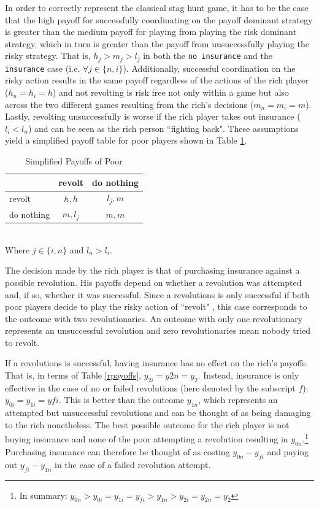 \documentclass[12pt]{article}
\begin{document}
	In order to correctly represent the classical stag hunt game, it has to be 
	the case that the high payoff for successfully coordinating on the payoff 
	dominant strategy is greater than the medium payoff for playing from 
	playing the risk dominant strategy, which in turn is greater than the 
	payoff from unsuccessfully playing the risky strategy. That is, $h_j > m_j 
	> l_j$ in both the \texttt{no insurance} and the \texttt{insurance} case 
	(i.e. $\forall j\in\{n, i\}$). Additionally, successful coordination on the 
	risky action results in the same payoff regardless of the actions of the 
	rich player ($h_n=h_i=h$) and not revolting is risk free not only within a 
	game but also across the two different games resulting from the rich's 
	decisions ($m_n=m_i=m$). Lastly, revolting unsuccessfully is worse if the 
	rich player takes out insurance ($l_i<l_n$) and can be seen as the rich 
	person ``fighting back". These assumptions yield a simplified payoff table 
	for poor players shown in Table \ref{spayoff}.
	
	\begin{table}[!htbp]
		\caption{Simplified Payoffs of Poor}
		\label{spayoff}
		\centering
		\begin{tabular}{|l|c|c|}
			\hline
			& revolt & do nothing\\
			\hline
			revolt & $h, h$ & $l_j, m$\\
			\hline
			do nothing & $m, l_j$ & $m, m$\\
			\hline
		\end{tabular}\\
		\footnotesize Where $j\in\{i, n\}$ and $l_n>l_i$.
	\end{table}
	
	The decision made by the rich player is that of purchasing insurance 
	against a possible revolution. His payoffs depend on whether a revolution 
	was attempted and, if so, whether it was successful. Since a revolutions is 
	only successful if both poor players decide to play the risky action of 
	``revolt" , this case corresponds to the outcome with two revolutionaries. 
	An outcome with only one revolutionary represents an unsuccessful 
	revolution and zero revolutionaries mean nobody tried to revolt.
	
	If a revolutions is successful, having insurance has no effect on the 
	rich's payoffs. That is, in terms of Table \ref{rpayoffs}, 
	$y_{2i}=y{2n}=y_2$. Instead, insurance is only effective in the case of no 
	or failed revolutions (here denoted by the subscript $f$): 
	$y_{0i}=y_{1i}=y{fi}$. This is better than the outcome $y_{1n}$, which 
	represents an attempted but unsuccessful revolutions and can be thought of 
	as being damaging to the rich nonetheless. The best possible outcome for 
	the rich player is not buying insurance and none of the poor attempting a 
	revolution resulting in $y_{0n}$.\footnote{In summary: $y_{0n} > 
	y_{0i}=y_{1i}=y_{fi} > y_{1n} > y_{2i}=y_{2n}=y_2$} Purchasing insurance 
	can therefore be thought of as costing $y_{0n}-y_{fi}$ and paying out 
	$y_{fi}-y_{1n}$ in the case of a failed revolution attempt.
	
\end{document}
